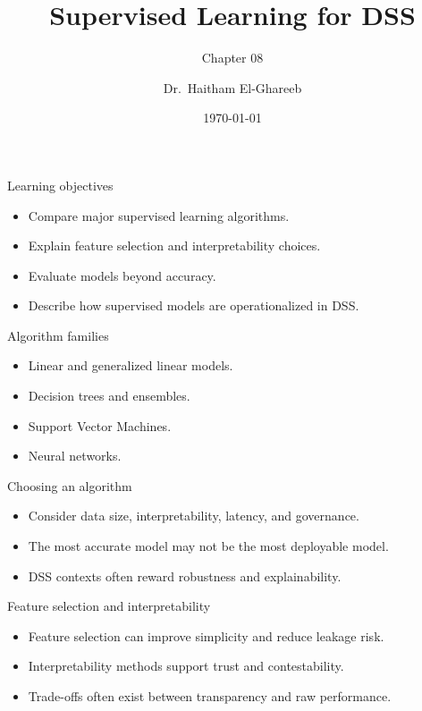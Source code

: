 \documentclass[aspectratio=169,11pt]{beamer}
\title[Supervised Learning]{Supervised Learning for DSS}
\subtitle{Chapter 08}
\author{Dr.\ Haitham El-Ghareeb}
\institute{Faculty of Computers and Information Sciences}
\date{\today}
\begin{document}
\begin{frame}
  \titlepage
\end{frame}

\begin{frame}{Learning objectives}
  \begin{itemize}
    \item Compare major supervised learning algorithms.
    \item Explain feature selection and interpretability choices.
    \item Evaluate models beyond accuracy.
    \item Describe how supervised models are operationalized in DSS.
  \end{itemize}
\end{frame}

\begin{frame}{Algorithm families}
  \begin{itemize}
    \item Linear and generalized linear models.
    \item Decision trees and ensembles.
    \item Support Vector Machines.
    \item Neural networks.
  \end{itemize}
\end{frame}

\begin{frame}{Choosing an algorithm}
  \begin{itemize}
    \item Consider data size, interpretability, latency, and governance.
    \item The most accurate model may not be the most deployable model.
    \item DSS contexts often reward robustness and explainability.
  \end{itemize}
\end{frame}

\begin{frame}{Feature selection and interpretability}
  \begin{itemize}
    \item Feature selection can improve simplicity and reduce leakage risk.
    \item Interpretability methods support trust and contestability.
    \item Trade-offs often exist between transparency and raw performance.
  \end{itemize}
\end{frame}
\end{document}
